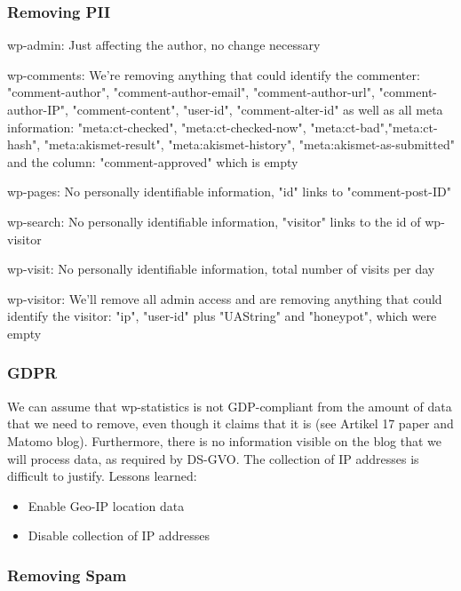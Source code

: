 \subsubsection{Removing PII}

wp-admin: Just affecting the author, no change necessary

wp-comments: We're removing anything that could identify the commenter: "comment-author", "comment-author-email", "comment-author-url", "comment-author-IP", "comment-content", "user-id", "comment-alter-id" as well as all meta information: "meta:ct-checked", "meta:ct-checked-now", "meta:ct-bad","meta:ct-hash", "meta:akismet-result", "meta:akismet-history", "meta:akismet-as-submitted" and the column: "comment-approved" which is empty

wp-pages: No personally identifiable information, "id" links to "comment-post-ID"

wp-search: No personally identifiable information, "visitor" links to the id of wp-visitor

wp-visit: No personally identifiable information, total number of visits per day

wp-visitor: We'll remove all admin access and are removing anything that could identify the visitor: "ip", "user-id" plus "UAString" and "honeypot", which were empty

\subsubsection{GDPR}

We can assume that wp-statistics is not GDP-compliant from the amount of data that we need to remove, even though it claims that it is (see Artikel 17 paper and Matomo blog). Furthermore, there is no information visible on the blog that we will process data, as required by DS-GVO. The collection of IP addresses is difficult to justify. Lessons learned:

\begin{itemize}
 \item Enable Geo-IP location data
 \item Disable collection of IP addresses
\end{itemize}

\subsubsection{Removing Spam}

